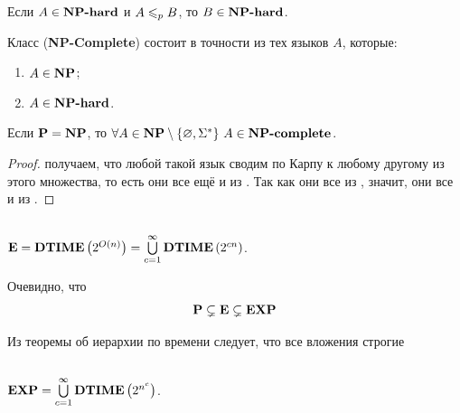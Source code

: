 \begin{statement}
Если $A \in \textbf{NP-hard}$ и $A \leqslant_p B$, то $B \in \textbf{NP-hard}$.
\end{statement}

\begin{statement}
Класс \npc (\textbf{NP-Complete}) состоит в точности из тех языков $A$, которые:
\begin{enumerate}
    \item $A \in \textbf{NP}$;
    \item $A \in \textbf{NP-hard}$.
\end{enumerate}
\end{statement}

\begin{statement}
Если $\textbf{P} = \textbf{NP}$, то 
$\forall A \in \textbf{NP} \setminus \{\varnothing, \Sigma^*\} \ A \in \textbf{NP-complete}$.
\end{statement}

\begin{proof} получаем, что любой такой язык сводим по Карпу к любому другому из этого множества, то есть они все ещё и из \nph. Так как они все из \np, значит, они все и из \npc.
\end{proof}


\subsection{\e}

\begin{definition}
$\textbf{E} = \textbf{DTIME}\left({2^{O(n)}}\right) = \bigcup\limits_{c = 1}^\infty \textbf{DTIME}\left({2^{cn}}\right)$.
\end{definition}

\begin{note}
Очевидно, что
\begin{equation*}
    \textbf{P} \subsetneq \textbf{E} \subsetneq \textbf{EXP}
\end{equation*}

Из теоремы об иерархии по времени следует, что все вложения строгие
\end{note}

\subsection{\EXP}

\begin{definition}
$\textbf{EXP} = \bigcup\limits_{c = 1}^\infty \textbf{DTIME}\left({2^{n^c}}\right)$.
\end{definition} 

